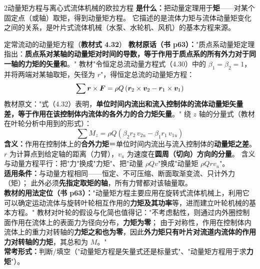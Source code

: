 \begin{kaodian}{2}{动量矩方程与离心式流体机械的欧拉方程}
\textbf{是什么：}把动量定理用于\textbf{矩}——对某个固定点（或轴）取矩，得到动量矩方程。
它描述的是流体力矩与流体动量矩变化之间的关系，是叶片式流体机械（水泵、水轮机、风机）的基本方程来源。

\begin{gongshi}{定常流动的动量矩方程（\textbf{教材式 4.32}）}
\textbf{教材原话（书 p63）：}"质点系动量矩定理指出：\textbf{质点系对某轴的动量矩对时间的导数，等于作用于质点系的所有外力对于同一轴的力矩的矢量和}。"
教材"令恒定总流动量方程式（4.30）中的 $\beta_1=\beta_2=1$，并将两端对某轴取矩，矢径为 $r$"，得恒定总流的动量矩方程：
\[ \sum\bm{r}\times\bm{F}=\rho Q\left(\bm{r}_2\times\bm{v}_2-\bm{r}_1\times\bm{v}_1\right) \]
教材原文："式（4.32）表明，\textbf{单位时间内流出和流入控制体的流体动量矩矢量差，等于作用在该控制体内流体的各外力的合力矩矢量}。"
绕 $z$ 轴的分量式（教材在叶轮分析中用到的形式）：
\[ \sum M_z=\rho Q\left(\beta_2 r_{2}\,v_{2u}-\beta_1 r_{1}\,v_{1u}\right) \]
\textbf{含义：}作用在控制体上的\textbf{合外力矩}＝单位时间内流出与流入控制体的\textbf{动量矩之差}。
$r$ 为计算点到给定轴的距离（力臂），$v_u$ 为速度在\textbf{圆周（切向）方向的分量}。
含义与动量方程平行：把"力"换成"力矩"、把"动量 $\rho Qv$"换成"动量矩 $\rho Qrv_u$"。\\
\textbf{适用条件：}与动量方程相同——恒定、不可压缩、断面取渐变流、只计外力（矩）；
此外必须\textbf{先指定取矩的轴}，所有力臂都对该轴量取。\\
\textbf{教材的用法定位（书 p63）：}"动量矩方程主要应用在旋转式流体机械上，利用它可以确定运动流体与旋转叶轮相互作用的\textbf{力矩及其功率}等，进而建立叶轮机械的基本方程。"
教材对叶轮的假设与化简也值得记："不考虑黏性，则通过内外圈控制面作用在流体上的表面力为径向分布，\textbf{力矩为零}；
由于对称性，作用在控制体内流体上的重力对转轴的\textbf{力矩之和也为零}，因此\textbf{外力矩只有叶片对流道内流体的作用力对转轴的力矩}，其总和为 $M$。"\\
\textbf{常考形式：}判断/填空（"动量矩方程是矢量式还是标量式"、"动量矩方程用于求\textbf{力矩}"）。
\end{gongshi}


\end{kaodian}
